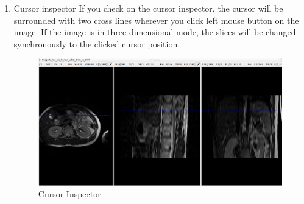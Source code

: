 \documentclass[12pt]{article}
\begin{document}
\begin{enumerate}
	\item Cursor inspector
	\newline If you check on the cursor inspector, the cursor will be surrounded with two cross lines wherever you click left mouse button on the image. If the image is in three dimensional mode, the slices will be changed synchronously to the clicked cursor position.
	\begin{figure}[htbp]	
		\centering
		\includegraphics[width=\textwidth]{cursor_inspector.png}
		\caption[Cursor Inspector]{Cursor Inspector}
		\label{fig:cursor_inspector}
	\end{figure}
\end{enumerate}
\end{document}
